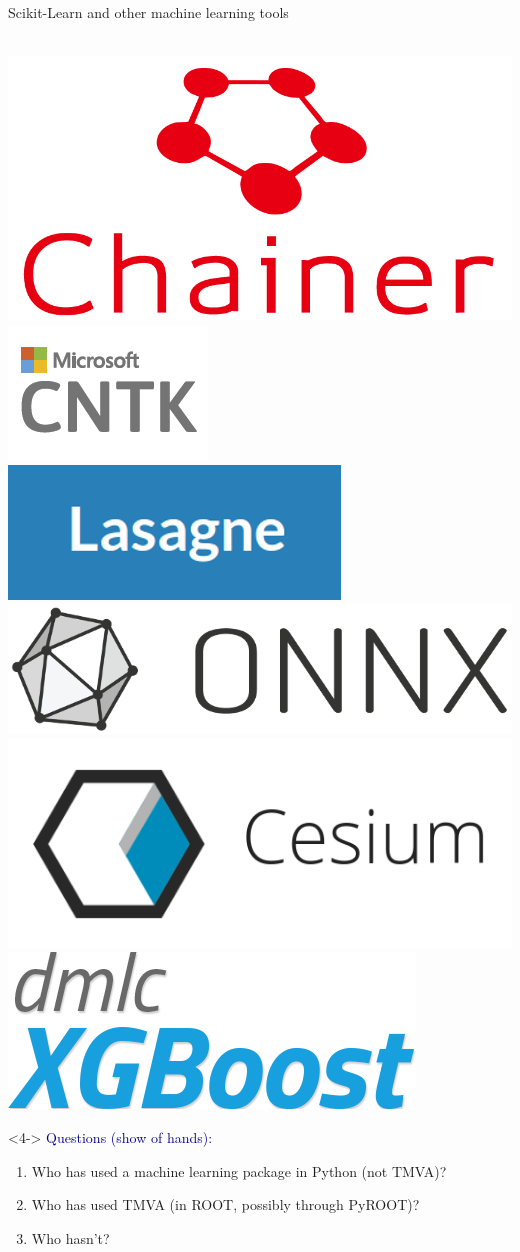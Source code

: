 \documentclass[aspectratio=169]{beamer}
\begin{document}
\begin{frame}{Scikit-Learn and other machine learning tools}
\begin{uncoverenv}
\vspace{0.15 cm}
\mbox{ } \includegraphics[height=0.8 cm]{chainer-logo.png}
\hfill \includegraphics[height=0.8 cm]{cntk-logo.png}
\hfill \includegraphics[height=0.8 cm]{lasagne-logo.png}
\hfill \includegraphics[height=0.8 cm]{onnx-logo.png}
\hfill \includegraphics[height=0.8 cm]{cesium-logo.png}
\hfill \includegraphics[height=0.8 cm]{xgboost-logo.png} \mbox{ }
\end{uncoverenv}

\vspace{0.5 cm}
\begin{uncoverenv}<4->
\small
\textcolor{darkblue}{Questions (show of hands):}
\vspace{-0.2 cm}
\begin{enumerate}\setlength{\itemsep}{-0.1 cm}
\item Who has used a machine learning package in Python (not TMVA)?
\item Who has used TMVA (in ROOT, possibly through PyROOT)?
\item Who hasn't?
\end{enumerate}
\end{uncoverenv}
\end{frame}
\end{document}
